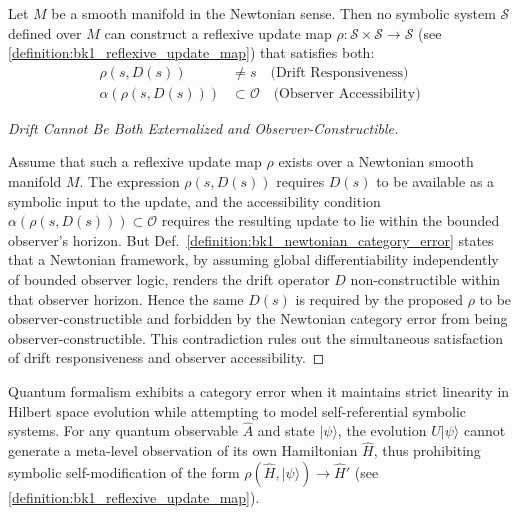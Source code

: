 \begin{proposition}
\label{proposition:bk1_newtonian_incompleteness}
Let $M$ be a smooth manifold in the Newtonian sense. Then no symbolic system $\mathcal{S}$ defined over $M$ can construct a reflexive update map $\rho: \mathcal{S} \times \mathcal{S} \to \mathcal{S}$ (see \ref{definition:bk1_reflexive_update_map}) that satisfies both:
\begin{align}
\rho(s, D(s)) &\neq s \quad \text{(Drift Responsiveness)} \\
\alpha(\rho(s, D(s))) &\subset \mathcal{O} \quad \text{(Observer Accessibility)}
\end{align}
\end{proposition}
\begin{proof}[Drift Cannot Be Both Externalized and Observer-Constructible]
\label{proof:bk1_newtonian_incompleteness}
\leavevmode

Assume that such a reflexive update map \(\rho\) exists over a Newtonian smooth
manifold \(M\). The expression \(\rho(s,D(s))\) requires \(D(s)\) to be
available as a symbolic input to the update, and the accessibility condition
\(\alpha(\rho(s,D(s)))\subset\mathcal{O}\) requires the resulting update to lie
within the bounded observer's horizon. But Def.~\ref{definition:bk1_newtonian_category_error}
states that a Newtonian framework, by assuming global differentiability
independently of bounded observer logic, renders the drift operator \(D\)
non-constructible within that observer horizon. Hence the same \(D(s)\) is
required by the proposed \(\rho\) to be observer-constructible and forbidden by
the Newtonian category error from being observer-constructible. This
contradiction rules out the simultaneous satisfaction of drift responsiveness
and observer accessibility.
\end{proof}

\begin{definition}
\label{definition:bk1_quantum_category_error}
Quantum formalism exhibits a category error when it maintains strict linearity in Hilbert space evolution while attempting to model self-referential symbolic systems. For any quantum observable $\hat{A}$ and state $|\psi\rangle$, the evolution $U|\psi\rangle$ cannot generate a meta-level observation of its own Hamiltonian $\hat{H}$, thus prohibiting symbolic self-modification of the form $\rho(\hat{H}, |\psi\rangle) \to \hat{H}'$ (see \ref{definition:bk1_reflexive_update_map}).
\end{definition}

